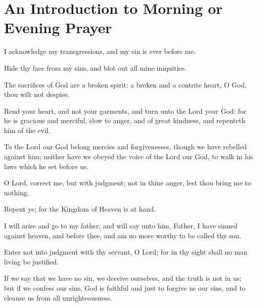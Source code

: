 \chapter[An Introduction]{An Introduction to Morning or Evening Prayer}


I acknowledge my transgressions, and my sin is ever before me.

Hide thy face from my sins, and blot out all mine iniquities.

The sacrifices of God are a broken spirit: a broken and a contrite heart, O God, thou wilt not despise.

Rend your heart, and not your garments, and turn unto the Lord your God: for he is gracious and merciful, slow to anger, and of great kindness, and repenteth him of the evil.

To the Lord our God belong mercies and forgivenesses, though we have rebelled against him; neither have we obeyed the voice of the Lord our God, to walk in his laws which he set before us.

O Lord, correct me, but with judgment; not in thine anger, lest thou bring me to nothing.

Repent ye; for the Kingdom of Heaven is at hand.

I will arise and go to my father, and will say unto him, Father, I have sinned against heaven, and before thee, and am no more worthy to be called thy son.

Enter not into judgment with thy servant, O Lord; for in thy sight shall no man living be justified.

If we say that we have no sin, we deceive ourselves, and the truth is not in us; but if we confess our sins, God is faithful and just to forgive us our sins, and to cleanse us from all unrighteousness.

\medskip


